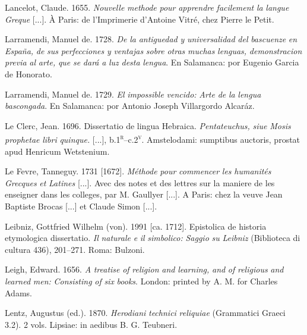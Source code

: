 Lancelot, Claude. 1655. \textit{Nouvelle} \textit{methode} \textit{pour} \textit{apprendre} \textit{facilement} \textit{la} \textit{langue} \textit{Greque} [...]. À Paris: de l’Imprimerie d’Antoine Vitré, chez Pierre le Petit.

Larramendi, Manuel de. 1728. \textit{De} \textit{la} \textit{antiguedad} \textit{y} \textit{universalidad} \textit{del} \textit{bascuenze} \textit{en} \textit{España,} \textit{de} \textit{sus} \textit{perfecciones} \textit{y} \textit{ventajas} \textit{sobre} \textit{otras} \textit{muchas} \textit{lenguas,} \textit{demonstracion} \textit{previa} \textit{al} \textit{arte,} \textit{que} \textit{se} \textit{dará} \textit{a} \textit{luz} \textit{desta} \textit{lengua}. En Salamanca: por Eugenio Garcia de Honorato.

Larramendi, Manuel de. 1729. \textit{El} \textit{impossible} \textit{vencido:} \textit{Arte} \textit{de} \textit{la} \textit{lengua} \textit{bascongada}. En Salamanca: por Antonio Joseph Villargordo Alcaráz.

Le Clerc, Jean. 1696. Dissertatio de lingua Hebraica. \textit{Pentateuchus,} \textit{siue} \textit{Mosis} \textit{prophetae} \textit{libri} \textit{quinque.} [...], b.1\textsc{\textsuperscript{r}}–c.2\textsc{\textsuperscript{v}}. Amstelodami: sumptibus auctoris, prostat apud Henricum Wetstenium.

Le Fevre, Tanneguy. 1731 [1672]. \textit{Méthode} \textit{pour} \textit{commencer} \textit{les} \textit{humanités} \textit{Grecques} \textit{et} \textit{Latines} [...]. Avec des notes et des lettres sur la maniere de les enseigner dans les colleges, par M. Gaullyer [...]. A Paris: chez la veuve Jean Baptiste Brocas [...] et Claude Simon [...].

Leibniz, Gottfried Wilhelm (von). 1991 [ca. 1712]. Epistolica de historia etymologica dissertatio. \textit{Il} \textit{naturale} \textit{e} \textit{il} \textit{simbolico:} \textit{Saggio} \textit{su} \textit{Leibniz} (Biblioteca di cultura 436), 201–271. Roma: Bulzoni.

Leigh, Edward. 1656. \textit{A} \textit{treatise} \textit{of} \textit{religion} \textit{and} \textit{learning,} \textit{and} \textit{of} \textit{religious} \textit{and} \textit{learned} \textit{men:} \textit{Consisting} \textit{of} \textit{six} \textit{books}. London: printed by A. M. for Charles Adams.

Lentz, Augustus (ed.). 1870. \textit{Herodiani} \textit{technici} \textit{reliquiae} (Grammatici Graeci 3.2). 2 vols. Lipsiae: in aedibus B. G. Teubneri.

